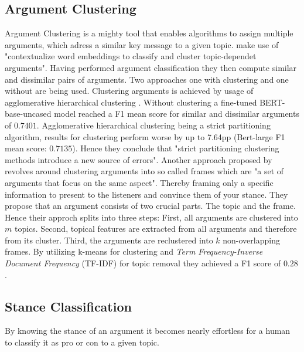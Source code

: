 \subsection{Argument Clustering}
Argument Clustering is a mighty tool that enables algorithms to assign multiple arguments, which adress a similar
key message to a given topic. \citet{reimers2019classification} make use of 
"contextualize word embeddings to classify and cluster topic-dependet arguments". Having performed argument
classification they then compute similar and dissimilar pairs of arguments. Two approaches one with clustering
and one without are being used. 
Clustering arguments is achieved by usage of agglomerative hierarchical clustering \cite{day1984efficient}. 
Without clustering a fine-tuned BERT-base-uncased model reached a F1 mean score for similar and dissimilar
arguments of $0.7401$. 
Agglomerative hierarchical clustering being a strict partitioning algorithm, results for clustering perform
worse by up to 7.64pp (Bert-large F1 mean score: $0.7135$). Hence they conclude that "strict partitioning 
clustering methods introduce a new source of errors".
Another approach proposed by \citet{ajjour2019modeling} revolves around clustering 
arguments into so called frames which are "a set of arguments that focus on the same aspect". 
Thereby framing \cite{entman1993framing} only a specific information to present to the listeners and convince 
them of your stance.
They propose that an argument consists of two crucial parts. The topic and the frame.
Hence their approch splits into three steps: First, all arguments are clustered into $m$ topics. Second,
topical features are extracted from all arguments and therefore from its cluster. Third, the arguments are 
reclustered into $k$ non-overlapping frames. By utilizing k-means \cite{hartigan1979ak} for clustering
and \textit{Term Frequency-Inverse Document Frequency} (TF-IDF) for topic removal they achieved a F1 score of 
$0.28$.


\subsection{Stance Classification}
By knowing the stance of an argument it becomes nearly effortless for a human to classify it as pro or con 
to a given topic. 
